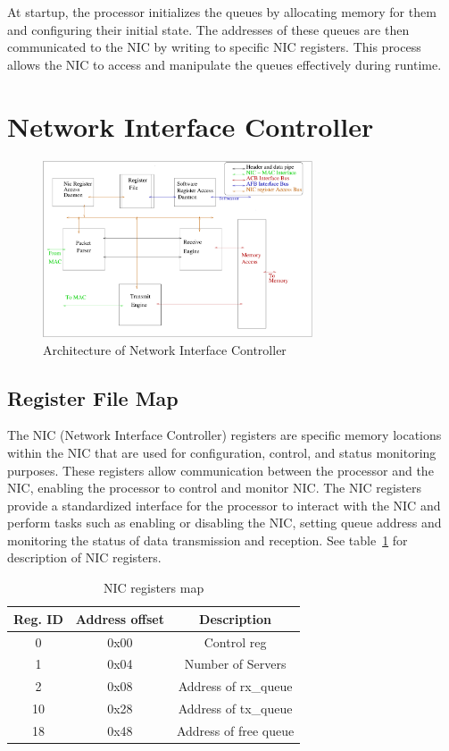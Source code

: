 \documentclass[12pt]{report}
\begin{document}
At startup, the processor initializes the queues by allocating memory for them and configuring their initial state. The addresses of these queues are then communicated to the NIC by writing to specific NIC registers. This process allows the NIC to access and manipulate the queues effectively during runtime. 


	\section{Network Interface Controller}
		

		\begin{figure}[h!]
			\centering
			\includegraphics[width=8cm]{./figures/NIC_Internal.pdf}
			\caption{Architecture of Network Interface Controller}
			\label{fig:NIC-Arch}
		\end{figure}

		\subsection{Register File Map} \label{subsec:NIC_REG}
				The NIC (Network Interface Controller) registers are specific memory locations within the NIC that are used for configuration, control, and status monitoring purposes. These registers allow communication between the processor and the NIC, enabling the processor to control and monitor NIC. The NIC registers provide a standardized interface for the processor to interact with the NIC and perform tasks such as enabling or disabling the NIC, setting queue address and monitoring the status of data transmission and reception. See table~\ref{tab:NIC_REG} for description of NIC registers.

			\begin{table}[h!]
				\centering
				\begin{tabular}{|c|c|c|}
					\hline
					Reg. ID& Address offset & Description  \\ \hline
					0  & 0x00  & Control reg    \\ \hline
					1  & 0x04  & Number of Servers    \\ \hline
					2  & 0x08  & Address of rx\_queue    \\ \hline
					10  & 0x28  & Address of tx\_queue    \\ \hline
					18  & 0x48  & Address of free queue    \\ \hline
				\end{tabular}
				\caption{NIC registers map}
				\label{tab:NIC_REG}
			\end{table}
\end{document}
